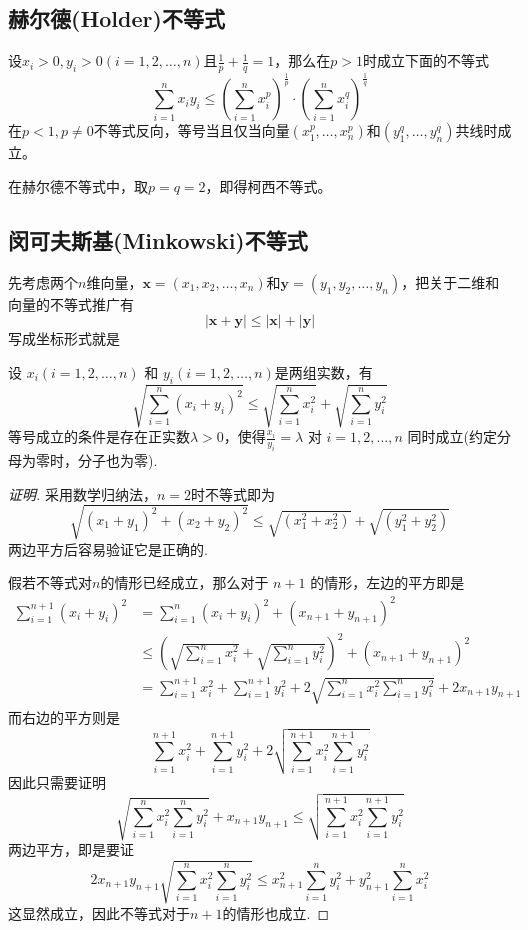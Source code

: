 \subsection{赫尔德(Holder)不等式}

\begin{theorem}[赫尔德不等式]
  设$x_i> 0, y_i> 0 (i=1,2,\ldots,n)$且$\frac{1}{p}+\frac{1}{q}=1$，那么在$p>1$时成立下面的不等式
  \begin{equation}
    \label{eq:holder-inequation}
    \sum_{i=1}^nx_iy_i \leqslant \left( \sum_{i=1}^nx_i^p \right)^{\frac{1}{p}} \cdot \left( \sum_{i=1}^nx_i^q \right)^{\frac{1}{q}}
  \end{equation}
  在$p<1,p\neq 0$不等式反向，等号当且仅当向量$(x_1^p,\ldots,x_n^p)$和$(y_1^q,\ldots,y_n^q)$共线时成立。
\end{theorem}
在赫尔德不等式中，取$p=q=2$，即得柯西不等式。

\subsection{闵可夫斯基(Minkowski)不等式}

先考虑两个$n$维向量，$\bm{x}=(x_1,x_2,\ldots,x_n)$和$\bm{y}=(y_1,y_2,\ldots,y_n)$，把关于二维和向量的不等式推广有
\[ |\bm{x+y}| \leqslant |\bm{x}| + |\bm{y}| \]
写成坐标形式就是
\begin{theorem}[闵可夫斯基不等式]
  设 $x_i(i=1,2,\ldots,n)$ 和 $y_i(i=1,2,\dots,n)$是两组实数，有
\[ \sqrt{\sum_{i=1}^n(x_i+y_i)^2} \leqslant \sqrt{\sum_{i=1}^nx_i^2} + \sqrt{\sum_{i=1}^ny_i^2} \]
等号成立的条件是存在正实数$\lambda>0$，使得$ \frac{x_i}{y_i} = \lambda $ 对 $i=1,2,\ldots,n$ 同时成立(约定分母为零时，分子也为零).
\end{theorem}

\begin{proof}[证明]
  采用数学归纳法，$n=2$时不等式即为
  \[ \sqrt{(x_1+y_1)^2+(x_2+y_2)^2} \leqslant \sqrt{(x_1^2+x_2^2)} + \sqrt{(y_1^2+y_2^2)} \]
  两边平方后容易验证它是正确的.

  假若不等式对$n$的情形已经成立，那么对于 $n+1$ 的情形，左边的平方即是
  \begin{equation*}
    \begin{split}
      \sum_{i=1}^{n+1}(x_{i}+y_{i})^2  & =   \sum_{i=1}^{n}(x_i+y_i)^2 + (x_{n+1}+y_{n+1})^2 \\
      & \leqslant  \left( \sqrt{\sum_{i=1}^nx_i^2} + \sqrt{\sum_{i=1}^ny_i^2} \right)^2 + (x_{n+1}+y_{n+1})^2 \\
      & =  \sum_{i=1}^{n+1}x_i^2 + \sum_{i=1}^{n+1}y_i^2 + 2 \sqrt{\sum_{i=1}^nx_i^2\sum_{i=1}^ny_i^2} + 2 x_{n+1}y_{n+1}
    \end{split}
  \end{equation*}
  而右边的平方则是
  \[ \sum_{i=1}^{n+1}x_i^2 + \sum_{i=1}^{n+1}y_i^2 + 2 \sqrt{\sum_{i=1}^{n+1}x_i^2\sum_{i=1}^{n+1}y_i^2} \]
  因此只需要证明
  \[ \sqrt{\sum_{i=1}^nx_i^2\sum_{i=1}^ny_i^2} +  x_{n+1}y_{n+1} \leqslant \sqrt{\sum_{i=1}^{n+1}x_i^2\sum_{i=1}^{n+1}y_i^2} \]
  两边平方，即是要证
  \[ 2x_{n+1}y_{n+1}\sqrt{\sum_{i=1}^nx_i^2\sum_{i=1}^ny_i^2} \leqslant x_{n+1}^{2}\sum_{i=1}^ny_i^2 + y_{n+1}^2\sum_{i=1}^nx_i^2 \]
  这显然成立，因此不等式对于$n+1$的情形也成立.
\end{proof}

